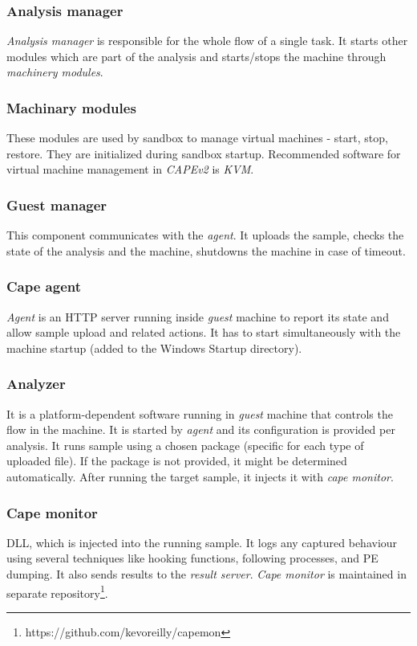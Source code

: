 \subsubsection*{Analysis manager}
\emph{Analysis manager} is responsible for the whole flow of a single task. It starts other modules which are part of the analysis and starts/stops the machine through \emph{machinery modules}.

\subsubsection*{Machinary modules}
These modules are used by sandbox to manage virtual machines - start, stop, restore. They are initialized during sandbox startup. Recommended  software for virtual machine management in \emph{CAPEv2} is \emph{KVM}.

\subsubsection*{Guest manager}
This component communicates with the \emph{agent}. It uploads the sample, checks the state of the analysis and the machine, shutdowns the machine in case of timeout.

\subsubsection*{Cape agent}
\emph{Agent} is an HTTP server running inside \emph{guest} machine to report its state and allow sample upload and related actions. It has to start simultaneously with the machine startup (added to the Windows Startup directory).

\subsubsection*{Analyzer}
It is a platform-dependent software running in \emph{guest} machine that controls the flow in the machine. It is started by \emph{agent} and its configuration is provided per analysis. It runs sample using a chosen package (specific for each type of uploaded file). If the package is not provided, it might be determined automatically. After running the target sample, it injects it with \emph{cape monitor}.

\subsubsection*{Cape monitor}
DLL, which is injected into the running sample. It logs any captured behaviour using several techniques like hooking functions, following processes, and PE dumping. It also sends results to the \emph{result server}. \emph{Cape monitor} is maintained in separate repository\footnote{https://github.com/kevoreilly/capemon}.

